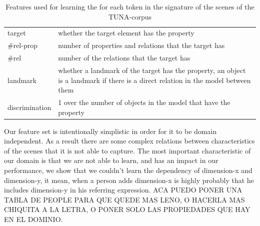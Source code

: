 \begin{small}
\begin{table}[h!]
\begin{center}
\begin{tabular}{|l|p{10cm}|}
\hline
target & whether the target element has the property \\
\#rel-prop & number of properties and relations that the target has\\
\#rel & number of the relations that the target has \\
landmark & whether a landmark of the target has the property, an object is a landmark if there is a direct relation in the model 
between them \\
discrimination & 1 over the number of objects in the model that have the property \\
\hline
\end{tabular}
\caption{Features used for learning the \puse for each token in the signature of the scenes of the TUNA-corpus} 
\label{features}
\end{center}
\end{table}
\end{small}
Our feature set is intentionally simplistic in order for it to be domain independent. As a result there are some complex relations 
between characteristics of the scenes that it is not able to capture. The most important characteristic of our domain is that we are not able 
to learn, and has an impact in our performance, we show that we couldn't learn the dependency of dimension-x and dimension-y, it mean, when a person adds dimension-x is highly probably that he includes dimension-y in his referring expression. ACA PUEDO PONER UNA TABLA DE PEOPLE PARA QUE QUEDE MAS LENO, O HACERLA MAS CHIQUITA A LA LETRA, O PONER SOLO LAS PROPIEDADES QUE HAY EN EL DOMINIO.

